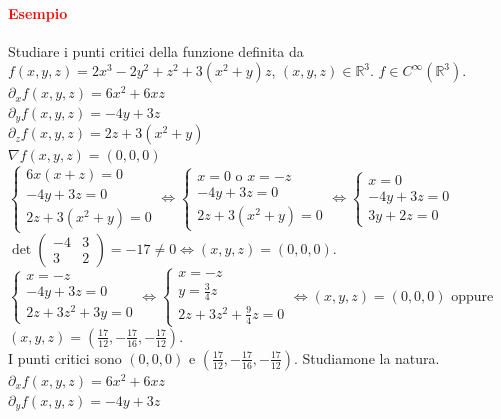 \documentclass{article}
\newcommand{\R}{\mathbb{R}}
\begin{document}
\paragraph{\textcolor{red}{Esempio}}
Studiare i punti critici della funzione definita da $f(x,y,z)=2x^3-2y^2+z^2+3(x^2+y)z$, $(x,y,z)\in \R^3$. $f\in C^\infty(\R^3)$.\\
$\partial_xf(x,y,z)=6x^2+6xz$\\
$\partial_yf(x,y,z)=-4y+3z$\\
$\partial_zf(x,y,z)=2z+3(x^2+y)$\\
$\nabla f(x,y,z)=(0,0,0)$\\
$\begin{cases}
    6x(x+z)=0\\
    -4y+3z=0\\
    2z+3(x^2+y)=0
\end{cases}\Leftrightarrow\begin{cases}
    x=0\text{  o  }x=-z\\
    -4y+3z=0\\
    2z+3(x^2+y)=0
\end{cases}\Leftrightarrow\begin{cases}
    x=0\\
    -4y+3z=0\\
    3y+2z=0
\end{cases}$\\
$\det\begin{pmatrix}
    -4&3\\
    3&2
\end{pmatrix}=-17\neq 0 \Leftrightarrow (x,y,z)=(0,0,0)$.\\
$\begin{cases}
    x=-z\\
    -4y+3z=0\\
    2z+3z^2+3y=0
\end{cases}\Leftrightarrow\begin{cases}
    x=-z\\
    y=\frac{3}{4}z\\
    2z+3z^2+\frac{9}{4}z=0
\end{cases}\Leftrightarrow (x,y,z)=(0,0,0)$ oppure $(x,y,z)=(\frac{17}{12},-\frac{17}{16},-\frac{17}{12})$.\\
I punti critici sono $(0,0,0)$ e $(\frac{17}{12},-\frac{17}{16},-\frac{17}{12})$. Studiamone la natura.\\
$\partial_xf(x,y,z)=6x^2+6xz$\\
$\partial_yf(x,y,z)=-4y+3z$\\
\end{document}

